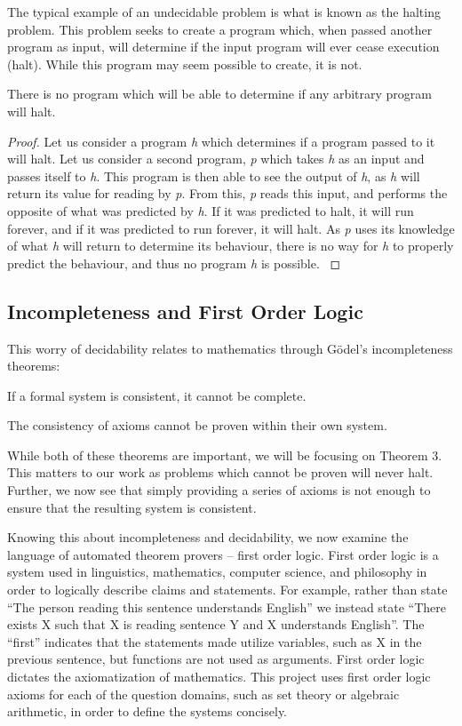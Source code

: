 The typical example of an undecidable problem is what is known as the halting problem. This problem seeks to create a program which, when passed another program as input, will determine if the input program will ever cease execution (halt). While this program may seem possible to create, it is not.

\begin{theorem}
There is no program which will be able to determine if any arbitrary program will halt.
\end{theorem}
\begin{proof}
Let us consider a program \textit{h} which determines if a program passed to it will halt. Let us consider a second program, \textit{p} which takes \textit{h} as an input and passes itself to \textit{h}. This program is then able to see the output of \textit{h}, as \textit{h} will return its value for reading by \textit{p}. From this, \textit{p} reads this input, and performs the opposite of what was predicted by \textit{h}. If it was predicted to halt, it will run forever, and if it was predicted to run forever, it will halt. As \textit{p} uses its knowledge of what \textit{h} will return to determine its behaviour, there is no way for \textit{h} to properly predict the behaviour, and thus no program \textit{h} is possible. \cite{haltProof}
\end{proof}

\subsection{Incompleteness and First Order Logic}\label{incompleteness}
This worry of decidability relates to mathematics through G\"odel's incompleteness theorems:
\begin{theorem}
If a formal system is consistent, it cannot be complete.
\end{theorem}
\begin{theorem}
	The consistency of axioms cannot be proven within their own system. \cite{Godel}
\end{theorem}

While both of these theorems are important, we will be focusing on Theorem 3. This matters to our work as problems which cannot be proven will never halt. Further, we now see that simply providing a series of axioms is not enough to ensure that the resulting system is consistent.

Knowing this about incompleteness and decidability, we now examine the language of automated theorem provers -- first order logic. First order logic is a system used in linguistics, mathematics, computer science, and philosophy in order to logically describe claims and statements. For example, rather than state ``The person reading this sentence understands English'' we instead state ``There exists X such that X is reading sentence Y and X understands English''. The ``first'' indicates that the statements made utilize variables, such as X in the previous sentence, but functions are not used as arguments. First order logic dictates the axiomatization of mathematics. This project uses first order logic axioms for each of the question domains, such as set theory or algebraic arithmetic, in order to define the systems concisely.

